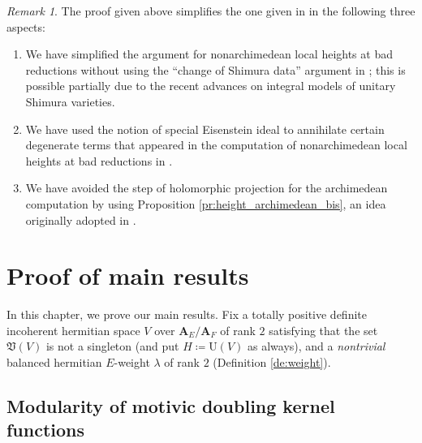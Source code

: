 \documentclass[12pt]{amsart}
\numberwithin{equation}{section}
\theoremstyle{plain}
\theoremstyle{definition}
\theoremstyle{remark}
\newtheorem{remark}[proposition]{Remark}
\renewcommand{\b}[1]{\mathbf{#1}}
\newcommand{\f}[1]{\mathfrak{#1}}
\renewcommand{\r}[1]{\mathrm{#1}}
\renewcommand{\(}{\left(}
\renewcommand{\)}{\right)}
\newcommand{\bA}{\b A}
\newcommand{\fV}{\f V}
\newcommand{\rU}{\r U}
\begin{document}
\begin{remark}\label{re:aipf}
The proof given above simplifies the one given in \cite{Liu12} in the following three aspects:
\begin{enumerate}
  \item We have simplified the argument for nonarchimedean local heights at bad reductions without using the ``change of Shimura data'' argument in \cite{Liu12}; this is possible partially due to the recent advances on integral models of unitary Shimura varieties.

  \item We have used the notion of special Eisenstein ideal to annihilate certain degenerate terms that appeared in the computation of nonarchimedean local heights at bad reductions in \cite{Liu12}.

  \item We have avoided the step of holomorphic projection for the archimedean computation by using Proposition \ref{pr:height_archimedean_bis}, an idea originally adopted in \cite{LL21}.
\end{enumerate}
\end{remark}



\section{Proof of main results}
\label{ss:6}

In this chapter, we prove our main results. Fix a totally positive definite incoherent hermitian space $V$ over $\bA_E/\bA_F$ of rank $2$ satisfying that the set $\fV(V)$ is not a singleton (and put $H\coloneqq\rU(V)$ as always), and a \emph{nontrivial} balanced hermitian $E$-weight $\lambda$ of rank $2$ (Definition \ref{de:weight}).


\subsection{Modularity of motivic doubling kernel functions}
\label{ss:modularity}
\end{document}
